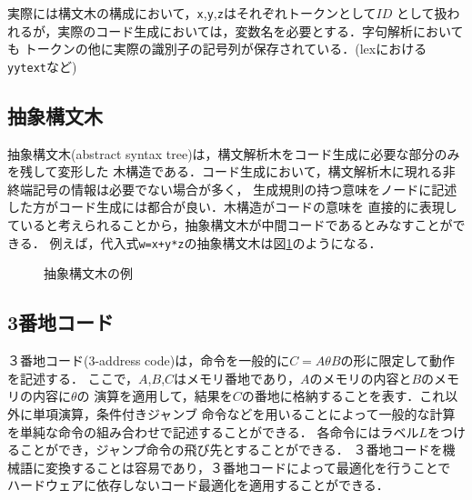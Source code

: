 \documentclass[dvipdfmx,a4j]{jbook}
\begin{document}
実際には構文木の構成において，\texttt{x},\texttt{y},\texttt{z}はそれぞれトークンとして$ID$
として扱われるが，実際のコード生成においては，変数名を必要とする．字句解析においても
トークンの他に実際の識別子の記号列が保存されている．(lexにおける\texttt{yytext}など)

\subsection{抽象構文木}

抽象構文木(abstract syntax tree)は，構文解析木をコード生成に必要な部分のみを残して変形した
木構造である．コード生成において，構文解析木に現れる非終端記号の情報は必要でない場合が多く，
生成規則の持つ意味をノードに記述した方がコード生成には都合が良い．木構造がコードの意味を
直接的に表現していると考えられることから，抽象構文木が中間コードであるとみなすことができる．
例えば，代入式\texttt{w=x+y*z}の抽象構文木は図\ref{ASTexample}のようになる．
\begin{figure}[t]
  \centering
  \caption{抽象構文木の例}\label{ASTexample}
\end{figure}

\subsection{3番地コード}

３番地コード(3-address code)は，命令を一般的に$C=A\theta B$の形に限定して動作を記述する．
ここで，$A$,$B$,$C$はメモリ番地であり，$A$のメモリの内容と$B$のメモリの内容に$\theta$の
演算を適用して，結果を$C$の番地に格納することを表す．これ以外に単項演算，条件付きジャンブ
命令などを用いることによって一般的な計算を単純な命令の組み合わせで記述することができる．
各命令にはラベル$L$をつけることができ，ジャンプ命令の飛び先とすることができる．
３番地コードを機械語に変換することは容易であり，３番地コードによって最適化を行うことで
ハードウェアに依存しないコード最適化を適用することができる．
\end{document}

